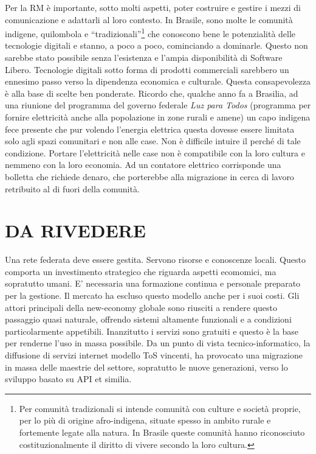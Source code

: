 Per la RM è importante, sotto molti aspetti, poter costruire e gestire
i mezzi di comunicazione e adattarli al loro contesto. In Brasile,
sono molte le comunità indigene, quilombola e
``tradizionali''\footnote{Per comunità tradizionali si intende
  comunità con culture e società proprie, per lo più di origine
  afro-indigena, situate spesso in ambito rurale e fortemente legate
  alla natura. In Brasile queste comunità hanno riconosciuto
  costituzionalmente il diritto di vivere secondo la loro cultura.}
che conoscono bene le potenzialità delle tecnologie digitali e stanno,
a poco a poco, cominciando a dominarle. Questo non sarebbe stato
possibile senza l'esistenza e l'ampia disponibilità di Software
Libero. Tecnologie digitali sotto forma di prodotti commerciali
sarebbero un ennesimo passo verso la dipendenza economica e
culturale. Questa consapevolezza è alla base di scelte ben
ponderate. Ricordo che, qualche anno fa a Brasilia, ad una riunione
del programma del governo federale \emph{Luz para Todos} (programma
per fornire elettricità anche alla popolazione in zone rurali e amene)
un capo indigena fece presente che pur volendo l'energia elettrica
questa dovesse essere limitata solo agli spazi comunitari e non alle
case. Non è difficile intuire il perché di tale condizione. Portare
l'elettricità nelle case non è compatibile con la loro cultura e
nemmeno con la loro economia. Ad un contatore elettrico corrisponde
una bolletta che richiede denaro, che porterebbe alla migrazione in
cerca di lavoro retribuito al di fuori della comunità.

\section{DA RIVEDERE}
Una rete federata deve essere gestita. Servono risorse e conoscenze
locali. Questo comporta un investimento strategico che riguarda
aspetti ecomomici, ma sopratutto umani. E' necessaria una formazione
continua e personale preparato per la gestione. Il mercato ha escluso
questo modello anche per i suoi costi. Gli attori principali della
new-economy globale sono riusciti a rendere questo passaggio quasi
naturale, offrendo sistemi altamente funzionali e a condizioni
particolarmente appetibili. Inanzitutto i servizi sono gratuiti e
questo è la base per renderne l'uso in massa possibile. Da un punto di
vista tecnico-informatico, la diffusione di servizi internet modello
ToS vincenti, ha provocato una migrazione in massa delle maestrie del
settore, sopratutto le nuove generazioni, verso lo sviluppo basato su
API et similia.

